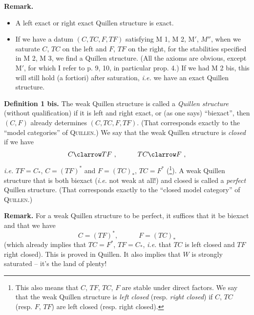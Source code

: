 \noindent\textbf{Remark.}
\begin{itemize}[leftmargin=3em]
\item[a)] A left exact or right exact Quillen structure is exact.
\item[b)] If we have a datum $(C, TC, F, TF)$ satisfying M 1, M 2, M$'$, $M''$, when we saturate $C$, $TC$ on the left and $F$, $TF$ on the right, for the stabilities specified in M 2, M 3, we find a Quillen structure. (All the axioms are obvious, except M$'$, for which I refer to p. 9, 10, in particular prop. 4.) If we had M 2 bis, this will still hold (a fortiori) after saturation, \textit{i.e.} we have an exact Quillen structure.
\end{itemize}

\noindent\textbf{Definition 1 bis.} The weak Quillen structure is called a \textit{Quillen structure} (without qualification) if it is left and right exact, or (as one says) ``biexact'', then $(C, F)$ already determines $(C, TC, F, TF)$. (That corresponds exactly to the ``model categories'' of \textsc{Quillen}.) We say that the weak Quillen structure is \textit{closed} if we have %
\[
C \clarrow TF\ , \qquad\quad TC \clarrow F\ ,
\]
\textit{i.e.} $TF = C_*$, $C = (TF)^*$ and $F = (TC)_*$, $TC = F^*$ (\footnote[21]{This also means that $C$, $TF$, $TC$, $F$ are stable under direct factors. We say that the weak Quillen structure is \textit{left closed} (resp. \textit{right closed}) if $C$, $TC$ (resp. $F$, $TF$) are left closed (resp. right closed).}). A weak Quillen structure that is both biexact (\textit{i.e.} not weak at all!) and closed is called a \textit{perfect} Quillen structure. (That corresponds exactly to the ``closed model category'' of \textsc{Quillen}.)

\noindent\textbf{Remark.} For a weak Quillen structure to be perfect, it suffices that it be biexact and that we have
\[
C = (TF)^*, \qquad\quad F = (TC)_*
\]
(which already implies that $TC = F^*$, $TF = C_*$, \textit{i.e.} that $TC$ is left closed and $TF$ right closed). This is proved in Quillen. It also implies that $W$ is strongly saturated -- it's the land of plenty!

\clearpage
{}

